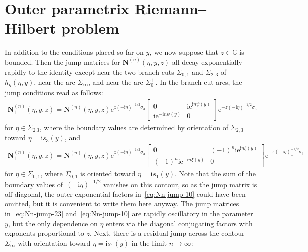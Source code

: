 \section{Outer parametrix Riemann--Hilbert problem}

In addition to the conditions placed so far on $y$, we now suppose that $z\in\mathbb{C}$ is bounded. Then the jump matrices for $\mathbf{N}^{(n)}(\eta,y,z)$ all decay exponentially rapidly to the identity except near the two branch cuts $\Sigma_{0,1}$ and $\Sigma_{2,3}$ of $h_\eta(\eta,y)$, near the arc $\Sigma_{\infty}^-$, and near the arc $\Sigma_0^+$. In the branch-cut arcs, the jump conditions read as follows:
\begin{gather}
\mathbf{N}^{(n)}_+(\eta,y,z)=\mathbf{N}^{(n)}_-(\eta,y,z)\mathrm{e}^{z(-\mathrm{i}\eta)^{-1/2}\sigma_3}\!\!\begin{bmatrix}0 & \mathrm{i}\mathrm{e}^{\mathrm{i} n\psi(y)}\\\mathrm{i}\mathrm{e}^{-\mathrm{i} n\psi(y)} & 0\end{bmatrix}\!\mathrm{e}^{-z(-\mathrm{i}\eta)^{-1/2}\sigma_3}
\!\label{eq:Nn-jump-23}
\end{gather}
for $\eta\in\Sigma_{2.3}$, where the boundary values are determined by orientation of $\Sigma_{2,3}$ toward $\eta=\mathrm{i} s_3(y)$, and
\begin{gather}
 \mathbf{N}^{(n)}_+(\eta,y,z)=\mathbf{N}^{(n)}_-(\eta,y,z)\mathrm{e}^{z(-\mathrm{i}\eta)^{-1/2}_-\sigma_3}\begin{bmatrix}0 & (-1)^n\mathrm{i}\mathrm{e}^{\mathrm{i} n\xi(y)}\\
(-1)^n\mathrm{i}\mathrm{e}^{-\mathrm{i} n\xi(y)} & 0\end{bmatrix}\mathrm{e}^{-z(-\mathrm{i}\eta)^{-1/2}_+\sigma_3} \!\!\!
\label{eq:Nn-jump-10}
\end{gather}
for $\eta\in\Sigma_{0,1}$, where $\Sigma_{0,1}$ is oriented toward $\eta=\mathrm{i} s_1(y)$.
Note that the sum of the boundary values of~$(-\mathrm{i}\eta)^{-1/2}$ vanishes on this contour, so as the jump matrix is off-diagonal, the outer exponential factors in~\eqref{eq:Nn-jump-10} could have been omitted, but it is convenient to write them here anyway. The jump matrices in~\eqref{eq:Nn-jump-23} and~\eqref{eq:Nn-jump-10} are rapidly oscillatory in the parameter $y$, but the only dependence on $\eta$ enters via the diagonal conjugating factors with exponents proportional to $z$. Next, there is a residual jump across the contour $\Sigma_\infty^-$ with orientation toward $\eta=\mathrm{i} s_1(y)$ in the limit $n\to\infty$:
